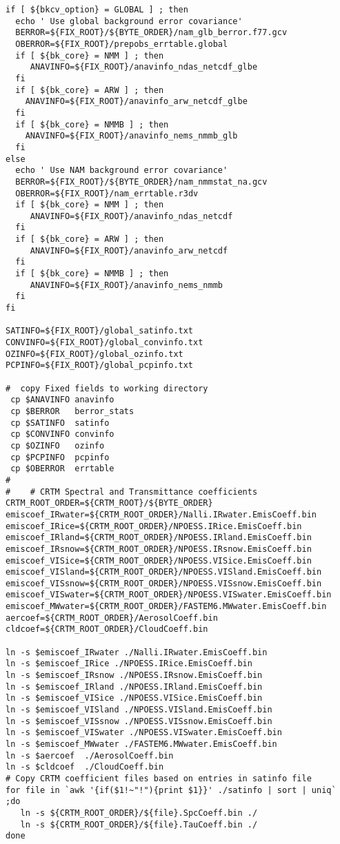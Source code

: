\begin{footnotesize}
\begin{verbatim}
if [ ${bkcv_option} = GLOBAL ] ; then
  echo ' Use global background error covariance'
  BERROR=${FIX_ROOT}/${BYTE_ORDER}/nam_glb_berror.f77.gcv
  OBERROR=${FIX_ROOT}/prepobs_errtable.global
  if [ ${bk_core} = NMM ] ; then
     ANAVINFO=${FIX_ROOT}/anavinfo_ndas_netcdf_glbe
  fi
  if [ ${bk_core} = ARW ] ; then
    ANAVINFO=${FIX_ROOT}/anavinfo_arw_netcdf_glbe
  fi
  if [ ${bk_core} = NMMB ] ; then
    ANAVINFO=${FIX_ROOT}/anavinfo_nems_nmmb_glb
  fi
else
  echo ' Use NAM background error covariance'
  BERROR=${FIX_ROOT}/${BYTE_ORDER}/nam_nmmstat_na.gcv
  OBERROR=${FIX_ROOT}/nam_errtable.r3dv
  if [ ${bk_core} = NMM ] ; then
     ANAVINFO=${FIX_ROOT}/anavinfo_ndas_netcdf
  fi
  if [ ${bk_core} = ARW ] ; then
     ANAVINFO=${FIX_ROOT}/anavinfo_arw_netcdf
  fi
  if [ ${bk_core} = NMMB ] ; then
     ANAVINFO=${FIX_ROOT}/anavinfo_nems_nmmb
  fi
fi

SATINFO=${FIX_ROOT}/global_satinfo.txt
CONVINFO=${FIX_ROOT}/global_convinfo.txt
OZINFO=${FIX_ROOT}/global_ozinfo.txt
PCPINFO=${FIX_ROOT}/global_pcpinfo.txt

#  copy Fixed fields to working directory
 cp $ANAVINFO anavinfo
 cp $BERROR   berror_stats
 cp $SATINFO  satinfo
 cp $CONVINFO convinfo
 cp $OZINFO   ozinfo
 cp $PCPINFO  pcpinfo
 cp $OBERROR  errtable
#
#    # CRTM Spectral and Transmittance coefficients
CRTM_ROOT_ORDER=${CRTM_ROOT}/${BYTE_ORDER}
emiscoef_IRwater=${CRTM_ROOT_ORDER}/Nalli.IRwater.EmisCoeff.bin
emiscoef_IRice=${CRTM_ROOT_ORDER}/NPOESS.IRice.EmisCoeff.bin
emiscoef_IRland=${CRTM_ROOT_ORDER}/NPOESS.IRland.EmisCoeff.bin
emiscoef_IRsnow=${CRTM_ROOT_ORDER}/NPOESS.IRsnow.EmisCoeff.bin
emiscoef_VISice=${CRTM_ROOT_ORDER}/NPOESS.VISice.EmisCoeff.bin
emiscoef_VISland=${CRTM_ROOT_ORDER}/NPOESS.VISland.EmisCoeff.bin
emiscoef_VISsnow=${CRTM_ROOT_ORDER}/NPOESS.VISsnow.EmisCoeff.bin
emiscoef_VISwater=${CRTM_ROOT_ORDER}/NPOESS.VISwater.EmisCoeff.bin
emiscoef_MWwater=${CRTM_ROOT_ORDER}/FASTEM6.MWwater.EmisCoeff.bin
aercoef=${CRTM_ROOT_ORDER}/AerosolCoeff.bin
cldcoef=${CRTM_ROOT_ORDER}/CloudCoeff.bin

ln -s $emiscoef_IRwater ./Nalli.IRwater.EmisCoeff.bin
ln -s $emiscoef_IRice ./NPOESS.IRice.EmisCoeff.bin
ln -s $emiscoef_IRsnow ./NPOESS.IRsnow.EmisCoeff.bin
ln -s $emiscoef_IRland ./NPOESS.IRland.EmisCoeff.bin
ln -s $emiscoef_VISice ./NPOESS.VISice.EmisCoeff.bin
ln -s $emiscoef_VISland ./NPOESS.VISland.EmisCoeff.bin
ln -s $emiscoef_VISsnow ./NPOESS.VISsnow.EmisCoeff.bin
ln -s $emiscoef_VISwater ./NPOESS.VISwater.EmisCoeff.bin
ln -s $emiscoef_MWwater ./FASTEM6.MWwater.EmisCoeff.bin
ln -s $aercoef  ./AerosolCoeff.bin
ln -s $cldcoef  ./CloudCoeff.bin
# Copy CRTM coefficient files based on entries in satinfo file
for file in `awk '{if($1!~"!"){print $1}}' ./satinfo | sort | uniq` ;do
   ln -s ${CRTM_ROOT_ORDER}/${file}.SpcCoeff.bin ./
   ln -s ${CRTM_ROOT_ORDER}/${file}.TauCoeff.bin ./
done


\end{verbatim}
\end{footnotesize}
